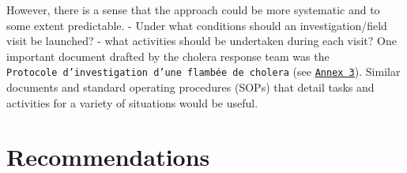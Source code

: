 \documentclass[]{tufte-handout}
\begin{document}
However, there is a sense that the approach could be more systematic and
to some extent predictable. - Under what conditions should an
investigation/field visit be launched? - what activities should be
undertaken during each visit? One important document drafted by the
cholera response team was the
\texttt{Protocole\ d’investigation\ d’une\ flambée\ de\ cholera} (see
\protect\hyperlink{annexes}{\texttt{Annex\ 3}}). Similar documents and
standard operating procedures (SOPs) that detail tasks and activities
for a variety of situations would be useful.

\clearpage

\section{Recommendations}\label{recommendations}
\end{document}
